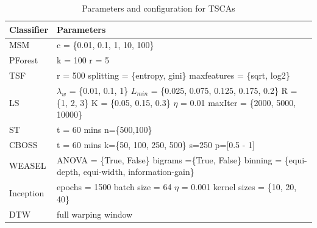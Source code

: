 \begin{table}[hbt!]
  \setlength\extrarowheight{2pt} %
  \begin{tabularx}{\textwidth}{|X|X|}
  \hline
  \textbf{Classifier} & \textbf{Parameters} \\ \hline
  MSM                 & c = \{0.01, 0.1, 1, 10, 100\}                                                        \\ \hline
  PForest             & k = 100 \newline r = 5                                                               \\ \hline
  TSF                 & r = 500 \newline splitting = \{entropy, gini\} \newline maxfeatures = \{sqrt, log2\} \\ \hline
  LS                  & $\lambda_{w}$ = \{0.01, 0.1, 1\} \newline
                        $L_{min}$ = \{0.025, 0.075, 0.125, 0.175, 0.2\} \newline R = \{1, 2, 3\} \newline
                        K = \{0.05, 0.15, 0.3\} \newline $\eta$ = 0.01 \newline
                        maxIter = \{2000, 5000, 10000\}                                                      \\ \hline
  ST                  & t = 60 mins \newline n=\{500,100\}                                                   \\ \hline
  CBOSS               & t = 60 mins \newline k=\{50, 100, 250, 500\} \newline s=250 \newline p=[0.5 - 1]     \\ \hline
  WEASEL              & ANOVA = \{True, False\} \newline bigrams =\{True, False\}
                        \newline binning = \{equi-depth, equi-width, information-gain\}                      \\ \hline
  Inception           & epochs = 1500 \newline batch size = 64 \newline $\eta$ = 0.001 \newline
                        kernel sizes = \{10, 20, 40\}                                                        \\ \hline
  DTW                 & full warping window                                                                  \\ \hline
  \end{tabularx}
  \caption{Parameters and configuration for TSCAs}
  \label{TableClassifierParams}
\end{table}

